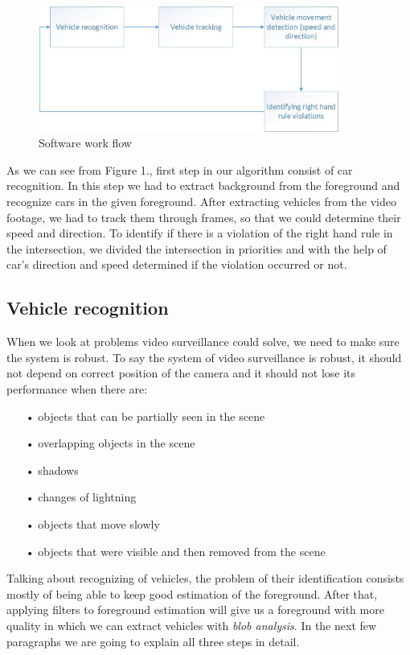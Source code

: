 \documentclass[12pt]{article} %
\begin{document}
\begin{figure}[ht]
\centering
\includegraphics[width=10cm]{Drawing1.jpg}
\caption{Software work flow}
\end{figure}

As we can see from Figure 1., first step in our algorithm consist of car recognition. In this step we had to extract background from the foreground and recognize cars in the given foreground. After extracting vehicles from the video footage, we had to track them through frames, so that we could determine their speed and direction. To identify if there is a violation of the right hand rule in the intersection, we divided the intersection in priorities and with the help of car's direction and speed determined if the violation occurred or not.


\subsection{Vehicle recognition} %

When we look at problems video surveillance could solve, we need to make sure the system is robust. To say the system of video surveillance is robust, it should not depend on correct position of the camera and it should not lose its performance when there are:

\begin{enumerate}
\item[•] objects that can be partially seen in the scene
\item[•] overlapping objects in the scene
\item[•] shadows
\item[•] changes of lightning
\item[•] objects that move slowly
\item[•] objects that were visible and then removed from the scene

\end{enumerate}

Talking about recognizing of vehicles, the problem of their identification consists mostly of being able to keep good estimation of the foreground. After that, applying filters to foreground estimation will give us a foreground with more quality in which we can extract vehicles with \textit{blob analysis}.
In the next few paragraphs we are going to explain all three steps in detail.
\end{document}
